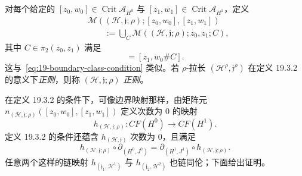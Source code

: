 对每个给定的
$[z_0,w_0]\in\operatorname{Crit}\mathcal A_{H^0}$ 与
$[z_1,w_1]\in\operatorname{Crit}\mathcal A_{H^1}$，定义
\[
\begin{aligned}
 &\mathcal M((\mathcal H,\mathfrak j;\rho);[z_0,w_0],[z_1,w_1])\\
 &\qquad:=\bigcup_C
 \mathcal M((\mathcal H,\mathfrak j;\rho);z_0,z_1;C),
\end{aligned}
\]
其中 $C\in\pi_2(z_0,z_1)$ 满足
\begin{equation}
 [z_1,w_1]=[z_1,w_0\#C].
\label{eq:19-chain-map-class-condition}
\end{equation}
这与~\eqref{eq:19-boundary-class-condition} 类似。若 $\rho$-拉长
$(\mathcal H^\rho,\mathfrak j^\rho)$ 在定义 19.3.2 的意义下\emph{\personFloer{}正则}，则称
$(\mathcal H,\mathfrak j;\rho)$ \emph{\personFloer{}正则}。

在定义 19.3.2 的条件下，可像边界映射那样，由矩阵元
$n_{(\mathcal H,\mathfrak j;\rho)}([z_0,w_0],[z_1,w_1])$ 定义次数为 $0$ 的映射
\[
 h_{(\mathcal H,\mathfrak j;\rho)}:CF(H^0)\longrightarrow CF(H^1).
\]
定义 19.3.2 的条件还蕴含 $h_{(\mathcal H,\mathfrak j)}$ 次数为 $0$，且满足
\[
 h_{(\mathcal H,\mathfrak j;\rho)}\circ\partial_{(H^0,J^0)}
 =\partial_{(H^1,J^1)}\circ h_{(\mathcal H,\mathfrak j;\rho)}.
\]
任意两个这样的链映射 $h_{(\mathfrak j_1,\mathcal H^1)}$ 与
$h_{(\mathfrak j_2,\mathcal H^2)}$ 也链同伦；下面给出证明。
